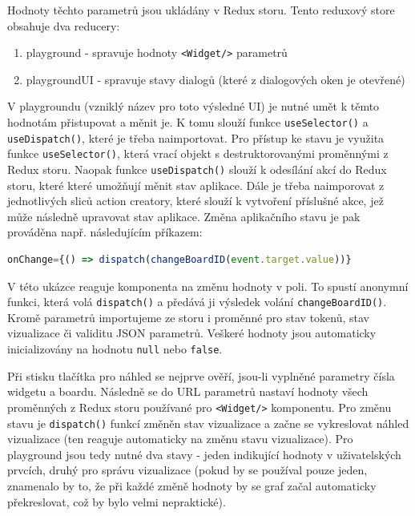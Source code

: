 \documentclass[czech, bc, kiv, he, iso690numb]{fasthesis}
\begin{document}
Hodnoty těchto parametrů jsou ukládány v Redux storu. Tento reduxový store obsahuje dva reducery: 

\begin{enumerate}
	\item playground - spravuje hodnoty \texttt{<Widget/>} parametrů 
	\item playgroundUI - spravuje stavy dialogů (které z dialogových oken je otevřené)
\end{enumerate}

V playgroundu (vzniklý název pro toto výsledné UI) je nutné umět k těmto hodnotám přistupovat a měnit je. K tomu slouží funkce \texttt{useSelector()} a \texttt{useDispatch()},
které je třeba naimportovat. Pro přístup ke stavu je využita funkce \texttt{useSelector()}, která vrací objekt s destruktorovanými proměnnými z Redux storu. Naopak funkce 
\texttt{useDispatch()} slouží k odesílání akcí do Redux storu, které které umožňují měnit stav aplikace. Dále je třeba naimporovat z jednotlivých sliců action creatory, které
slouží k vytvoření příslušné akce, jež může následně upravovat stav aplikace. Změna aplikačního stavu je pak prováděna např. následujícím příkazem:

\begin{lstlisting}[language=Javascript]
onChange={() => dispatch(changeBoardID(event.target.value))}
\end{lstlisting}

V této ukázce reaguje komponenta na změnu hodnoty v poli. To spustí anonymní funkci, která volá \texttt{dispatch()} a předává ji výsledek volání \texttt{changeBoardID()}. Kromě parametrů
importujeme ze storu i proměnné pro stav tokenů, stav vizualizace či validitu JSON parametrů. Veškeré hodnoty jsou automaticky inicializovány na hodnotu \texttt{null} nebo \texttt{false}.

Při stisku tlačítka pro náhled se nejprve ověří, jsou-li vyplněné parametry čísla widgetu a boardu. Následně se do URL parametrů nastaví hodnoty všech proměnných z Redux storu
používané pro \texttt{<Widget/>} komponentu. Pro změnu stavu je \texttt{dispatch()} funkcí změněn stav vizualizace a začne se vykreslovat náhled vizualizace (ten reaguje automaticky
na změnu stavu vizualizace). Pro playground jsou tedy nutné dva stavy - jeden indikující hodnoty v uživatelských prvcích, druhý pro správu vizualizace (pokud by se používal pouze jeden,
znamenalo by to, že při každé změně hodnoty by se graf začal automaticky překreslovat, což by bylo velmi nepraktické).
\end{document}
